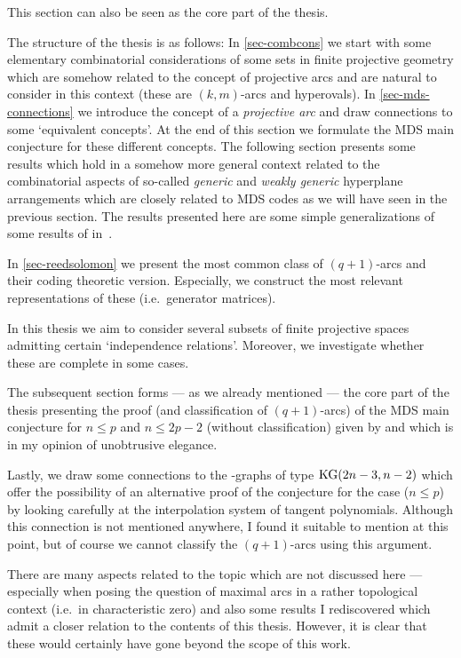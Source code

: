 This section can also be seen as the core part of the thesis.

The structure of the thesis is as follows:
In \autoref{sec-combcons} we start with some elementary combinatorial considerations of some sets in finite projective geometry which are somehow related to the concept of projective arcs and are natural to consider in this context (these are $(k,m)$-arcs and hyperovals).
In \autoref{sec-mds-connections} we introduce the concept of a \emph{projective arc} and draw connections to some `equivalent concepts'. At the end of this section we formulate the MDS main conjecture for these different concepts.
The following section presents some results which hold in a somehow more general context related to the combinatorial aspects of so-called \emph{generic} and \emph{weakly generic} hyperplane arrangements which are closely related to MDS codes as we will have seen in the previous section. The results presented here are some simple generalizations of some results of  in~\cite{zas}.

In \autoref{sec-reedsolomon} we present the most common class of $(q+1)$-arcs and their coding theoretic version.
Especially, we construct the most relevant representations of these (i.e.~generator matrices).

In this thesis we aim to consider several subsets of finite projective spaces admitting certain `independence relations'. Moreover, we investigate whether these are complete in some cases.

The subsequent section forms --- as we already mentioned --- the core part of the thesis presenting the proof (and classification of $(q+1)$-arcs) of the MDS main conjecture for $n\leq p$ and $n\leq 2p-2$ (without classification) given by  and  which is in my opinion of unobtrusive elegance.

Lastly, we draw some connections to the -graphs of type $\mathop\mathrm{KG}(2n-3,n-2)$ which offer the possibility of an alternative proof of the conjecture for the case ($n\leq p$) by looking carefully at the interpolation system of tangent polynomials. Although this connection is not mentioned anywhere, I found it suitable to mention at this point, but of course we cannot classify the $(q+1)$-arcs using this argument.

There are many aspects related to the topic which are not discussed here --- especially when posing the question of maximal arcs in a rather topological context (i.e.~in characteristic zero) and also some results I rediscovered which admit a closer relation to the contents of this thesis. However, it is clear that these would certainly have gone beyond the scope of this work.

